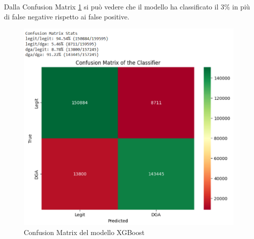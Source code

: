\documentclass[12pt,a4paper,openright,twoside]{book}
\begin{document}
\noindent Dalla Confusion Matrix \ref{fig:XGBoost confusion matrix} si può vedere che il modello ha classificato
il 3\% in più di false negative rispetto ai false positive.
\begin{figure}[H]
    \centering
    \includegraphics[width=.8\linewidth]{figures/XGBoost_conf_matr.png}
    \caption{Confusion Matrix del modello XGBoost}
    \label{fig:XGBoost confusion matrix}
\end{figure}
\end{document}
